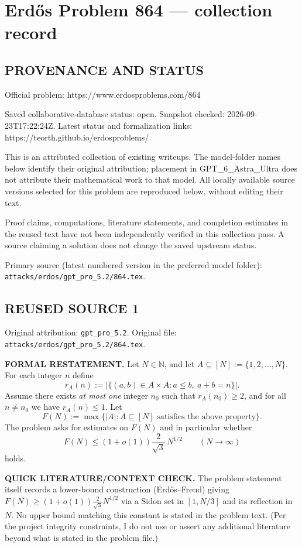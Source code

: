 \section*{Erd\H{o}s Problem 864 --- collection record}

\subsection*{PROVENANCE AND STATUS}
Official problem: https://www.erdosproblems.com/864

Saved collaborative-database status: open.
Snapshot checked: 2026-09-23T17:22:24Z.
Latest status and formalization links: https://teorth.github.io/erdosproblems/

This is an attributed collection of existing writeups. The model-folder names below identify their original attribution; placement in GPT\_6\_Astra\_Ultra does not attribute their mathematical work to that model. All locally available source versions selected for this problem are reproduced below, without editing their text.

Proof claims, computations, literature statements, and completion estimates in the reused text have not been independently verified in this collection pass. A source claiming a solution does not change the saved upstream status.

Primary source (latest numbered version in the preferred model folder): \texttt{attacks/erdos/gpt\_pro\_5.2/864.tex}.

\subsection*{REUSED SOURCE 1}
Original attribution: \texttt{gpt\_pro\_5.2}.
Original file: \texttt{attacks/erdos/gpt\_pro\_5.2/864.tex}.


\noindent\textbf{FORMAL RESTATEMENT.}
Let $N\in\mathbb{N}$, and let $A\subseteq [N]:=\{1,2,\dots,N\}$.  For each integer $n$ define
\[
 r_A(n):=\bigl|\{(a,b)\in A\times A: a\le b,\ a+b=n\}\bigr|.
\]
Assume there exists \emph{at most one} integer $n_0$ such that $r_A(n_0)\ge 2$, and for all $n\ne n_0$ we have $r_A(n)\le 1$.  Let
\[
F(N):=\max\{|A|:A\subseteq [N]\text{ satisfies the above property}\}.
\]
The problem asks for estimates on $F(N)$ and in particular whether
\[
F(N)\le (1+o(1))\frac{2}{\sqrt 3}\,N^{1/2}\qquad (N\to\infty)
\]
holds.

\medskip
\noindent\textbf{QUICK LITERATURE/CONTEXT CHECK.}
The problem statement itself records a lower-bound construction (Erd\H{o}s--Freud) giving
$F(N)\ge (1+o(1))\tfrac{2}{\sqrt 3}N^{1/2}$ via a Sidon set in $[1,N/3]$ and its reflection in $N$.
No upper bound matching this constant is stated in the problem text.
(Per the project integrity constraints, I do not use or assert any additional literature beyond what is stated in the problem file.)

